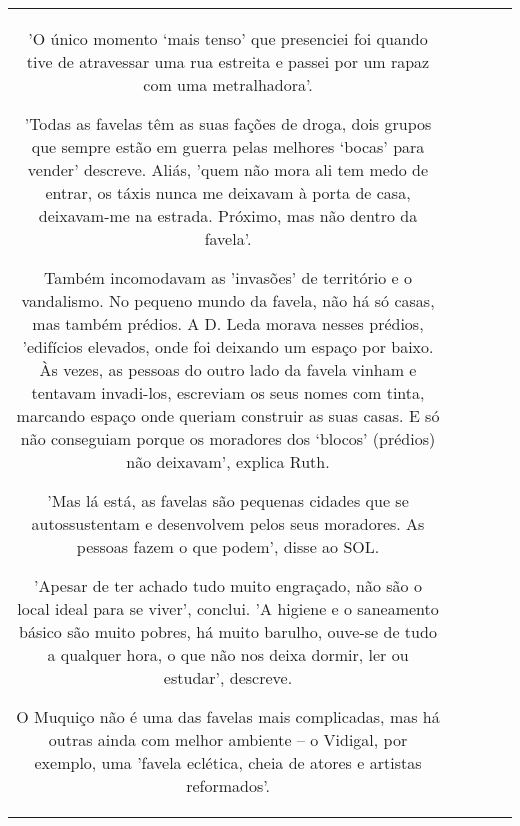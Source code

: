 \documentclass[11pt]{article}
\newlength\mylength
\begin{document}
\begin{center}
\begin{longtable}{|C{.65\mylength}|C{.30\mylength}|C{.12\mylength}|C{.12\mylength}|C{.12\mylength}|}
'O único momento ‘mais tenso' que presenciei foi quando tive de atravessar uma rua estreita e passei por um rapaz com uma metralhadora'.

'Todas as favelas têm as suas fações de droga, dois grupos que sempre estão em guerra pelas melhores ‘bocas' para vender' descreve. Aliás, 'quem não mora ali tem medo de entrar, os táxis nunca me deixavam à porta de casa, deixavam-me na estrada. Próximo, mas não dentro da favela'.

Também incomodavam as 'invasões' de território e o vandalismo. No pequeno mundo da favela, não há só casas, mas também prédios. A D. Leda morava nesses prédios, 'edifícios elevados, onde foi deixando um espaço por baixo. Às vezes, as pessoas do outro lado da favela vinham e tentavam invadi-los, escreviam os seus nomes com tinta, marcando espaço onde queriam construir as suas casas. E só não conseguiam porque os moradores dos ‘blocos' (prédios) não deixavam', explica Ruth.

'Mas lá está, as favelas são pequenas cidades que se autossustentam e desenvolvem pelos seus moradores. As pessoas fazem o que podem', disse ao SOL.

'Apesar de ter achado tudo muito engraçado, não são o local ideal para se viver', conclui. 'A higiene e o saneamento básico são muito pobres, há muito barulho, ouve-se de tudo a qualquer hora, o que não nos deixa dormir, ler ou estudar', descreve.

O Muquiço não é uma das favelas mais complicadas, mas há outras ainda com melhor ambiente – o Vidigal, por exemplo, uma 'favela eclética, cheia de atores e artistas reformados'.


\end{longtable}
\end{center}
\end{document}
